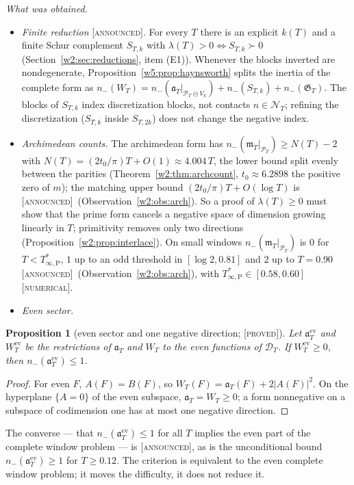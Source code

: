 \documentclass[11pt]{amsart}
\newtheorem{proposition}[theorem]{Proposition}
\theoremstyle{definition}
\theoremstyle{remark}
\numberwithin{equation}{section}
\newcommand{\PT}{\mathcal{P}_T}                        %
\newcommand{\DT}{\mathcal{D}_T}                        %
\newcommand{\NT}{\mathcal{N}_T}                        %
\newcommand{\mT}{\mathfrak{m}_T}                       %
\newcommand{\aT}{\mathfrak{a}_T}                       %
\newcommand{\WT}{W_T}                                  %
\newcommand{\lam}{\lambda(T)}                          %
\newcommand{\Tarch}{T^{*}_{\infty,\mathrm P}}          %
\newcommand{\stag}[1]{\textsc{[#1]}}
\newcommand{\PROVED}{\stag{proved}}
\newcommand{\NUM}{\stag{numerical}}
\newcommand{\ANNOUNCED}{\stag{announced}}
\newcommand{\entry}[1]{\par\smallskip\noindent\textit{#1.}\enspace}
\begin{document}
\entry{What was obtained}

\begin{itemize}
\item \emph{Finite reduction} \ANNOUNCED. For every $T$ there is an explicit $k(T)$ and a finite Schur complement $S_{T,k}$
with $\lam>0\iff S_{T,k}\succ0$ (Section~\ref{w2:sec:reductions}, item (E1)). Whenever the blocks inverted are nondegenerate, Proposition~\ref{w5:prop:haynsworth} splits the
inertia of the complete form as $n_-(\WT)=n_-(\aT|_{\PT\ominus V_k})+n_-(S_{T,k})+n_-(\mathfrak G_T)$.
The blocks of $S_{T,k}$ index discretization blocks, not contacts $n\in\NT$; refining the discretization ($S_{T,k}$ inside
$S_{T,2k}$) does not change the negative index.
\item \emph{Archimedean counts.} The archimedean form has $n_-(\mT|_{\PT})\ge N(T)-2$ with $N(T)=(2t_0/\pi)T+O(1)\approx4.004\,T$, the
lower bound split evenly between the parities (Theorem~\ref{w2:thm:archcount}, $t_0\approx6.2898$ the positive zero of
$m$); the matching upper bound $(2t_0/\pi)T+O(\log T)$ is \ANNOUNCED\ (Observation~\ref{w2:obs:arch}). So a proof of $\lam\ge0$ must show that the prime form cancels a negative space of dimension growing
linearly in $T$; primitivity removes only two directions (Proposition~\ref{w2:prop:interlace}). On small windows
$n_-(\mT|_{\PT})$ is $0$ for $T<\Tarch$, $1$ up to an odd threshold in $[\log2,0.81]$ and $2$ up to $T=0.90$
\ANNOUNCED\ (Observation~\ref{w2:obs:arch}), with $\Tarch\in[0.58,0.60]$ \NUM.
\item \emph{Even sector.}
\end{itemize}

\begin{proposition}[even sector and one negative direction; \PROVED]\label{w5:prop:evenone}
Let $\aT^{\mathrm{ev}}$ and $\WT^{\mathrm{ev}}$ be the restrictions of $\aT$ and $\WT$ to the even functions of $\DT$. If
$\WT^{\mathrm{ev}}\ge0$, then $n_-(\aT^{\mathrm{ev}})\le1$.
\end{proposition}

\begin{proof}
For even $F$, $A(F)=B(F)$, so $\WT(F)=\aT(F)+2|A(F)|^2$. On the hyperplane $\{A=0\}$ of the even subspace,
$\aT=\WT\ge0$; a form nonnegative on a subspace of codimension one has at most one negative direction.
\end{proof}

The converse --- that $n_-(\aT^{\mathrm{ev}})\le1$ for all $T$ implies the even part of the complete window problem --- is
\ANNOUNCED, as is the unconditional bound $n_-(\aT^{\mathrm{ev}})\ge1$ for $T\ge0.12$. The criterion is equivalent to the
even complete window problem; it moves the difficulty, it does not reduce it.
\end{document}
